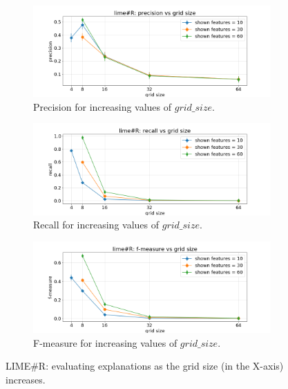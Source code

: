 \documentclass[12pt, twoside, a4paper]{report}
\begin{document}
\newpage


\begin{figure}[h]
\begin{subfigure}[b]{\linewidth}
\includegraphics[width=\linewidth]{images/figs/VSGRID/limesharpR/limesharpR: precision vs grid size.png} 
\caption{Precision for increasing values of $grid\_size$.}
\label{subfig:limesharp_R_prec_vs_gs}
\end{subfigure}
\begin{subfigure}[b]{\linewidth}
\includegraphics[width=\linewidth]{images/figs/VSGRID/limesharpR/limesharpR: recall vs grid size.png} 
\caption{Recall for increasing values of $grid\_size$.}
\label{subfig:limesharp_R_rec_vs_gs}
\end{subfigure}
\begin{subfigure}[b]{\linewidth}
\includegraphics[width=\linewidth]{images/figs/VSGRID/limesharpR/limesharpR: f-measure vs grid size.png} 
\caption{F-measure for increasing values of $grid\_size$.}
\label{subfig:limesharp_R_fmea_vs_gs}
\end{subfigure}
\caption{LIME\#R: evaluating explanations as the grid size (in the X-axis) increases.}
\label{fig:limesharp_R_vs_gs}
\end{figure}
\end{document}
